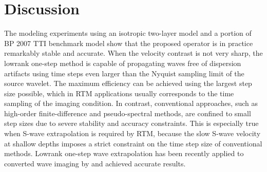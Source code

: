 
\section{Discussion}

The modeling experiments using an isotropic two-layer model and a portion of BP 2007 TTI benchmark model show that the proposed operator is in practice remarkably stable and accurate. When the velocity contrast is not very sharp, the lowrank one-step method is capable of propagating waves free of dispersion artifacts using time steps even larger than the Nyquist sampling limit of the source wavelet. The maximum efficiency can be achieved using the largest step size possible, which in RTM applications usually corresponds to the time sampling of the imaging condition. In contrast, conventional approaches, such as high-order finite-difference and pseudo-spectral methods, are confined to small step sizes due to severe stability and accuracy constraints. This is especially true when S-wave extrapolation is required by RTM, because the slow S-wave velocity at shallow depths imposes a strict constraint on the time step size of conventional methods. Lowrank one-step wave extrapolation has been recently applied to converted wave imaging by \cite{casasanta15} and achieved accurate results.

